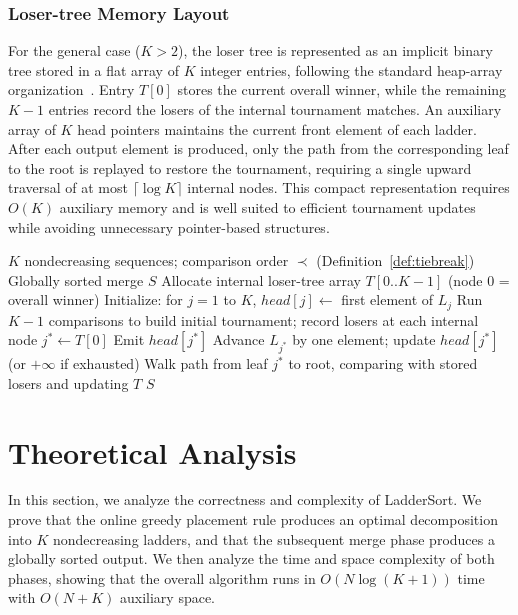 \documentclass{ieeeaccess}
\theoremstyle{plain}
\theoremstyle{definition}
\begin{document}
\subsubsection{Loser-tree Memory Layout}
For the general case ($K>2$), the loser tree is represented as an implicit binary tree stored in a flat array of $K$ integer entries, following the standard heap-array organization~\cite{Knuth1998}. Entry $T[0]$ stores the current overall winner, while the remaining $K-1$ entries record the losers of the internal tournament matches. An auxiliary array of $K$ head pointers maintains the current front element of each ladder. After each output element is produced, only the path from the corresponding leaf to the root is replayed to restore the tournament, requiring a single upward traversal of at most $\lceil\log K\rceil$ internal nodes. This compact representation requires $O(K)$ auxiliary memory and is well suited to efficient tournament updates while avoiding unnecessary pointer-based structures.


\begin{algorithm}[t]
\caption{\textsc{KWayLoserTree}$(L_1, \dots, L_K)$}
\label{alg:loser}
\begin{algorithmic}[1]
\Require $K$ nondecreasing sequences; comparison order $\prec$ (Definition~\ref{def:tiebreak})
\Ensure Globally sorted merge $S$
\State Allocate internal loser-tree array $T[0..K-1]$ (node 0 = overall winner)
\State Initialize: for $j = 1$ to $K$, $\mathit{head}[j] \gets$ first element of $L_j$
\State Run $K-1$ comparisons to build initial tournament; record losers at each internal node
    \State $j^* \gets T[0]$ 
    \State Emit $\mathit{head}[j^*]$
    \State Advance $L_{j^*}$ by one element; update $\mathit{head}[j^*]$ (or $+\infty$ if exhausted)
    \State Walk path from leaf $j^*$ to root, comparing with stored losers and updating $T$
\EndWhile
\State \Return $S$
\end{algorithmic}
\end{algorithm}




 
\section{Theoretical Analysis}
\label{sec:theory}
In this section, we analyze the correctness and complexity of LadderSort.  We prove that the online greedy placement rule produces an optimal decomposition into $K$ nondecreasing ladders, and that the subsequent merge phase produces a globally sorted output.  We then analyze the time and space complexity of both phases, showing that the overall algorithm runs in $O(N \log (K + 1))$ time with $O(N + K)$ auxiliary space.
\end{document}
